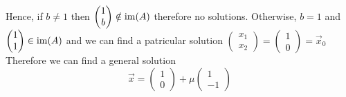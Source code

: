 \documentclass{article}
\numberwithin{equation}{section}
\begin{document}
\begin{eg}
\begin{enumerate}[label=(\arabic*)]
        Hence, if $b \neq 1$ then $\begin{pmatrix}
            1 \\ b
        \end{pmatrix} \notin \operatorname{im}(A)$ therefore no solutions.
        Otherwise, $b = 1$ and $\begin{pmatrix}
            1 \\ 1
        \end{pmatrix} \in \operatorname{im}(A)$ and we can find a patricular solution $\begin{pmatrix}
            x_1 \\ x_2
        \end{pmatrix} = \begin{pmatrix}
            1 \\ 0
        \end{pmatrix} = \vec x_0$
        Therefore we can find a general solution
        \[
            \vec x = \begin{pmatrix}
                1 \\ 0
            \end{pmatrix} + \mu \begin{pmatrix}
                1 \\ -1
            \end{pmatrix}  
        \]


\end{enumerate}
\end{eg}
\end{document}
